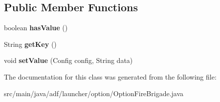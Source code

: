 \subsection*{Public Member Functions}
\begin{DoxyCompactItemize}
\item 
\hypertarget{classadf_1_1launcher_1_1option_1_1OptionFireBrigade_aa82570affa16a50701642d994ae8119a}{}\label{classadf_1_1launcher_1_1option_1_1OptionFireBrigade_aa82570affa16a50701642d994ae8119a} 
boolean {\bfseries has\+Value} ()
\item 
\hypertarget{classadf_1_1launcher_1_1option_1_1OptionFireBrigade_acbc174554f49eefcb346550a9f986c81}{}\label{classadf_1_1launcher_1_1option_1_1OptionFireBrigade_acbc174554f49eefcb346550a9f986c81} 
String {\bfseries get\+Key} ()
\item 
\hypertarget{classadf_1_1launcher_1_1option_1_1OptionFireBrigade_a91bf1bef4817bd7db392c27d2ae6af4d}{}\label{classadf_1_1launcher_1_1option_1_1OptionFireBrigade_a91bf1bef4817bd7db392c27d2ae6af4d} 
void {\bfseries set\+Value} (Config config, String data)
\end{DoxyCompactItemize}


The documentation for this class was generated from the following file\+:\begin{DoxyCompactItemize}
\item 
src/main/java/adf/launcher/option/Option\+Fire\+Brigade.\+java\end{DoxyCompactItemize}
